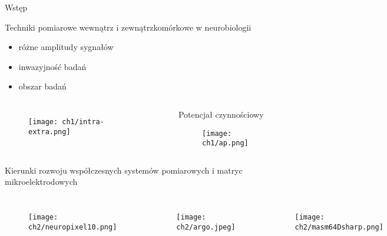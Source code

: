

\begin{frame}{Wstęp}

    \begin{block}{Techniki pomiarowe wewnątrz i zewnątrzkomórkowe w neurobiologii}
        \begin{itemize}
            \item różne amplitudy sygnałów
            \item inwazyjność badań
            \item obszar badań 
        \end{itemize}
    \end{block}
\begin{columns}
        \begin{figure}[H]
            \texttt{[image: ch1/intra-extra.png]}  
        \end{figure}
        \begin{alertblock}{Potencjał czynnościowy}
            \begin{figure}[H]
                \texttt{[image: ch1/ap.png]}
            \end{figure}
        \end{alertblock}

    \end{columns}


    
\end{frame}

\begin{frame}{Kierunki rozwoju współczesnych systemów pomiarowych i matryc mikroelektrodowych}
    \vspace{-5mm} %

    \begin{columns}[t]
        \begin{figure}[H]
            \texttt{[image: ch2/neuropixel10.png]}  
        \end{figure}

        \begin{figure}[H]
            \texttt{[image: ch2/argo.jpeg]}  
        \end{figure}

        \begin{figure}[H]
            \texttt{[image: ch2/masm64Dsharp.png]}
        \end{figure}

        \begin{figure}[H]
            \texttt{[image: ch2/utahArr.png]}
        \end{figure}

    \end{columns}


\end{frame}

